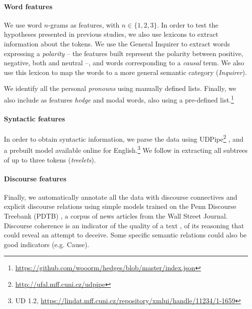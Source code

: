 \documentclass[11pt,letterpaper]{article}
\begin{document}
\paragraph{Word features}

We use word $n$-grams as features, 
with $n \in \{1,2,3\}$. In order to test the hypotheses presented in previous studies, we also use lexicons to extract information about the tokens.
We use the General Inquirer \cite{stone:general:1966} to extract words expressing a \textit{polarity} -- the features built represent the polarity between positive, negative, both and neutral --, and words corresponding to a \textit{causal} term. 
We also use this lexicon to map the words to a more general semantic category (\textit{Inquirer}).

We identify all the personal \textit{pronouns} 
using manually defined lists. 
Finally, we also include as features \textit{hedge} and modal words, also using a pre-defined list.\footnote{\url{https://github.com/wooorm/hedges/blob/master/index.json}}



\paragraph{Syntactic features}

In order to obtain syntactic information, we parse the data using UDPipe\footnote{\url{http://ufal.mff.cuni.cz/udpipe}} \cite{udpipe:2016}, and a prebuilt model available online for English.\footnote{UD 1.2, \url{https://lindat.mff.cuni.cz/repository/xmlui/handle/11234/1-1659}} 
We follow \cite{johannsen:cross:2015} in extracting all subtrees of up to three tokens (\textit{treelets}). 


\paragraph{Discourse features}

Finally, we automatically annotate all the data with discourse connectives and explicit discourse relations using simple models trained on the Penn Discourse Treebank (PDTB) \cite{prasad:penn:2008}, a corpus of news articles from the Wall Street Journal.
Discourse coherence is an indicator of the quality of a text  \cite{lin:automatically:2011}, of its reasoning that could reveal an attempt to deceive. Some specific semantic relations could also be good indicators (e.g. Cause).
\end{document}
